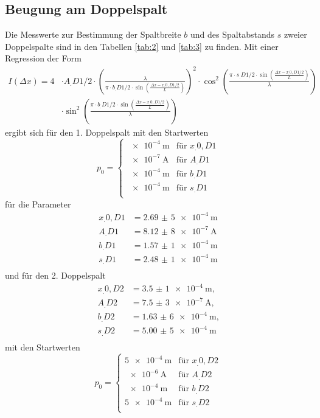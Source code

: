 \subsection{Beugung am Doppelspalt}
Die Messwerte zur Bestimmung der Spaltbreite $b$ und des Spaltabstands $s$ zweier Doppelspalte sind in den Tabellen \ref{tab:2} und \ref{tab:3} zu finden.
Mit einer Regression der Form 
\[
\begin{split}
I(\Delta x)=4&\cdot A_.{D1/2}\cdot \left(
\frac{\lambda}{\pi\cdot b_.{D1/2}\cdot\sin{\left(\frac{\Delta x-x_.{0,D1/2}}{L}\right)}}\right)^2\cdot\cos^2{\left(\frac{\pi\cdot s_.{D1/2}\cdot \sin{\left(\frac{\Delta x-x_.{0,D1/2}}{L}\right)}}{\lambda}\right)}\\
&\cdot\sin^2{\left(\frac{\pi\cdot b_.{D1/2}\cdot\sin{\left(\frac{\Delta x-x_.{0,D1/2}}{L}\right)}}{\lambda}\right)}
\end{split}
\]
ergibt sich für den 1. Doppelspalt mit den Startwerten
\begin{equation*}
p_0=
\begin{cases}
\SI{e-4}{\metre}		& \text{für } x_.{0,D1}\\
\SI{e-7}{\ampere}		& \text{für } A_.{D1}\\
\SI{e-4}{\metre}		& \text{für } b_.{D1}\\
\SI{e-4}{\metre}		& \text{für } s_.{D1}\\
\end{cases}
\end{equation*}
für die Parameter
\begin{align*}
x_.{0,D1} &= \SI{2,69(5)e-4}{\metre}\\
A_.{D1} &= \SI{8,12(8)e-7}{\ampere}\\
b_.{D1}	  &= \SI{1,57(1)e-4}{\metre}\\
s_.{D1}	  &= \SI{2,48(1)e-4}{\metre}\\
\end{align*}
und für den 2. Doppelspalt 
\begin{align*}
x_.{0,D2} &= \SI{3,5(1)e-4}{\metre}\text{,}\\
A_.{D2} &= \SI{7,5(3)e-7}{\ampere}\text{,}\\
b_.{D2}	  &= \SI{1,63(6)e-4}{\metre}\text{,}\\
s_.{D2}	  &= \SI{5,00(5)e-4}{\metre}\\
\end{align*}
mit den Startwerten
\begin{equation*}
p_0=
\begin{cases}
\SI{5e-4}{\metre}		& \text{für } x_.{0,D2}\\
\SI{e-6}{\ampere}		& \text{für } A_.{D2}\\
\SI{e-4}{\metre}		& \text{für } b_.{D2}\\
\SI{5e-4}{\metre}		& \text{für } s_.{D2}\\
\end{cases}
\end{equation*}
